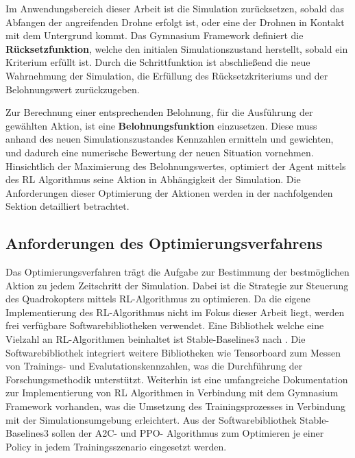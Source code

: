 Im Anwendungsbereich dieser Arbeit ist die Simulation zurücksetzen, sobald das Abfangen der angreifenden Drohne erfolgt ist, oder eine der Drohnen in Kontakt mit dem Untergrund kommt.
Das Gymnasium Framework definiert die \textbf{Rücksetzfunktion}, welche den initialen Simulationszustand herstellt, sobald ein Kriterium erfüllt ist.
Durch die Schrittfunktion ist abschließend die neue Wahrnehmung der Simulation, die Erfüllung des Rücksetzkriteriums und der Belohnungswert zurückzugeben.

Zur Berechnung einer entsprechenden Belohnung, für die Ausführung der gewählten Aktion, ist eine \textbf{Belohnungsfunktion} einzusetzen.
Diese muss anhand des neuen Simulationszustandes Kennzahlen ermitteln und gewichten, und dadurch eine numerische Bewertung der neuen Situation vornehmen.
Hinsichtlich der Maximierung des Belohnungswertes, optimiert der Agent mittels des RL Algorithmus seine Aktion in Abhängigkeit der Simulation. 
Die Anforderungen dieser Optimierung der Aktionen werden in der nachfolgenden Sektion detailliert betrachtet.

\subsection{Anforderungen des Optimierungsverfahrens}

Das Optimierungsverfahren trägt die Aufgabe zur Bestimmung der bestmöglichen Aktion zu jedem Zeitschritt der Simulation.
Dabei ist die Strategie zur Steuerung des Quadrokopters mittels RL-Algorithmus zu optimieren.
Da die eigene Implementierung des RL-Algorithmus nicht im Fokus dieser Arbeit liegt, werden frei verfügbare Softwarebibliotheken verwendet.
Eine Bibliothek welche eine Vielzahl an RL-Algorithmen beinhaltet ist Stable-Baselines3 nach \cite[]{Raffin.2021}.
Die Softwarebibliothek integriert weitere Bibliotheken wie Tensorboard zum Messen von Trainings- und Evalutationskennzahlen, was die Durchführung der Forschungsmethodik unterstützt.
Weiterhin ist eine umfangreiche Dokumentation zur Implementierung von RL Algorithmen in Verbindung mit dem Gymnasium Framework vorhanden, was die Umsetzung des Trainingsprozesses in Verbindung mit der Simulationsumgebung erleichtert.
Aus der Softwarebibliothek Stable-Baselines3 sollen der A2C- und PPO- Algorithmus zum Optimieren je einer Policy in jedem Trainingsszenario eingesetzt werden. 

